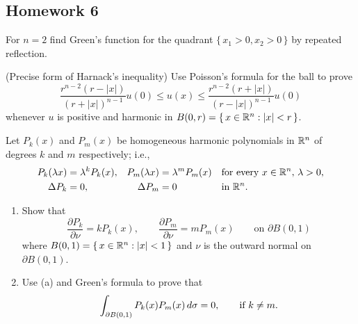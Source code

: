\subsection{Homework 6}
\begin{problem}
  For \(n=2\) find Green's function for the quadrant
  \(\{\,x_1>0,x_2>0\,\}\) by repeated reflection.
\end{problem}
\begin{solution}
\end{solution}

\begin{problem}
  (Precise form of Harnack's inequality) Use Poisson's formula for the ball
  to prove
  \[
    \frac{r^{n-2}(r-|x|)}{(r+|x|)^{n-1}}u(0)%
    \leq u(x)%
    \leq \frac{r^{n-2}(r+|x|)}{(r-|x|)^{n-1}}u(0)
  \]
  whenever \(u\) is positive and harmonic in
  \(B(0,r)=\{\,x\in\mathbb{R}^n:|x|<r\,\}\).
\end{problem}
\begin{solution}
\end{solution}

\begin{problem}
  Let \(P_k(x)\) and \(P_m(x)\) be homogeneous harmonic polynomials in
  \(\mathbb{R}^n\) of degrees \(k\) and \(m\) respectively; i.e.,
  \begin{align*}
    P_k(\lambda x)&=\lambda^k P_k(x),&P_m(\lambda x)&=\lambda^m P_m(x)
    &&\text{for every \(x\in\mathbb{R}^n\), \(\lambda>0\),}\\
    \Delta P_k&=0,&\Delta P_m&=0&&\text{in \(\mathbb{R}^n\).}
  \end{align*}
  \begin{enumerate}[label=(\alph*),noitemsep]
  \item Show that
    \[
      \frac{\partial P_k}{\partial \nu}=kP_k(x),\qquad
      \frac{\partial P_m}{\partial\nu}=mP_m(x)\qquad\text{on \(\partial B(0,1)\)}
    \]
    where \(B(0,1)=\{\,x\in\mathbb{R}^n:|x|<1\,\}\) and \(\nu\) is the outward
    normal on \(\partial B(0,1)\).
  \item Use (a) and Green's formula to prove that
    \[
      \int_{\partial B(0,1)}P_k(x)P_m(x)\mathop{}\!d\sigma=0,\qquad\text{if
        \(k\neq m\).}
    \]
  \end{enumerate}
\end{problem}
\begin{solution}
\end{solution}

